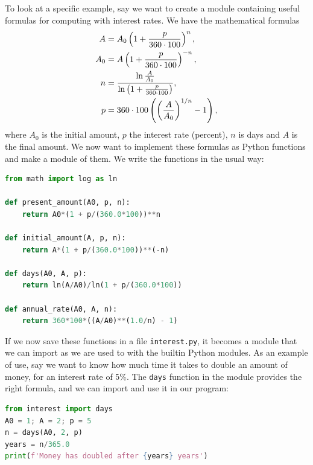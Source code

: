 \documentclass[graybox,envcountchap,sectrefs,final]{svmonodo}
\begin{document}
To look at a specific example, say we want to create a module containing useful formulas for computing
with interest rates. We have the mathematical formulas
\begin{align}
A &= A_0\left( 1 + {p\over 360\cdot 100}\right)^{n},
\label{input:mod:eq1}\\ 
A_0 &= A\left( 1 + {p\over 360\cdot 100}\right)^{-n},
\label{input:mod:eq2}\\ 
n &= \frac{\ln {A\over A_0}}{\ln \left( 1 + {p\over 360\cdot 100}\right)} ,
\label{input:mod:eq3}\\ 
p &= 360\cdot 100 \left(\left({A\over A_0}\right)^{1/n} - 1\right),
\label{input:mod:eq4}
\end{align}
where $A_0$ is the initial amount, $p$ the interest rate (percent), $n$ is days and $A$ is the final amount.
We now want to implement these formulas as Python functions and make a module of them. We write the
functions in the usual way:
\begin{lstlisting}[language=Python,style=blue1]
from math import log as ln

def present_amount(A0, p, n):
    return A0*(1 + p/(360.0*100))**n

def initial_amount(A, p, n):
    return A*(1 + p/(360.0*100))**(-n)

def days(A0, A, p):
    return ln(A/A0)/ln(1 + p/(360.0*100))

def annual_rate(A0, A, n):
    return 360*100*((A/A0)**(1.0/n) - 1)
\end{lstlisting}
If we now save these functions in a file \texttt{interest.py}, it becomes a module that we can import as we are used to
with the builtin Python modules.
As an example of use, say we want to know how much time it takes to double an amount of money, for an interest
rate of 5\%. The \texttt{days} function in the module provides the right formula, and we can import and use it in our program:
\begin{lstlisting}[language=Python,style=blue1]
from interest import days
A0 = 1; A = 2; p = 5
n = days(A0, 2, p)
years = n/365.0
print(f'Money has doubled after {years} years')
\end{lstlisting}
\end{document}
